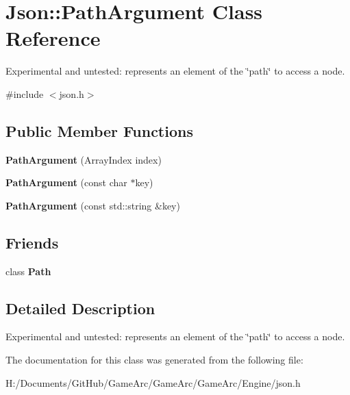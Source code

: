 \hypertarget{class_json_1_1_path_argument}{\section{Json\+:\+:Path\+Argument Class Reference}
\label{class_json_1_1_path_argument}
}


Experimental and untested\+: represents an element of the \char`\"{}path\char`\"{} to access a node.  




{\ttfamily \#include $<$json.\+h$>$}

\subsection*{Public Member Functions}
\begin{DoxyCompactItemize}
\item 
\hypertarget{class_json_1_1_path_argument_a53c5b27143b161301b95fd544c139ecf}{{\bfseries Path\+Argument} (Array\+Index index)}\label{class_json_1_1_path_argument_a53c5b27143b161301b95fd544c139ecf}

\item 
\hypertarget{class_json_1_1_path_argument_a9690417a8a40e6e49f2acdf6c9281345}{{\bfseries Path\+Argument} (const char $\ast$key)}\label{class_json_1_1_path_argument_a9690417a8a40e6e49f2acdf6c9281345}

\item 
\hypertarget{class_json_1_1_path_argument_a08f872cfee4fc600f7fa3bcaaff0d41c}{{\bfseries Path\+Argument} (const std\+::string \&key)}\label{class_json_1_1_path_argument_a08f872cfee4fc600f7fa3bcaaff0d41c}

\end{DoxyCompactItemize}
\subsection*{Friends}
\begin{DoxyCompactItemize}
\item 
\hypertarget{class_json_1_1_path_argument_a4877239a6b7f09fbf5a61ca68a49d74c}{class {\bfseries Path}}\label{class_json_1_1_path_argument_a4877239a6b7f09fbf5a61ca68a49d74c}

\end{DoxyCompactItemize}


\subsection{Detailed Description}
Experimental and untested\+: represents an element of the \char`\"{}path\char`\"{} to access a node. 

The documentation for this class was generated from the following file\+:\begin{DoxyCompactItemize}
\item 
H\+:/\+Documents/\+Git\+Hub/\+Game\+Arc/\+Game\+Arc/\+Game\+Arc/\+Engine/json.\+h\end{DoxyCompactItemize}
